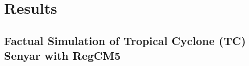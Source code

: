 \documentclass[
11pt,notheorems,hyperref={pdfauthor=whatever}
]{beamer}
\begin{document}
    



\section{Results}

\subsection{Factual Simulation of Tropical Cyclone (TC) Senyar with RegCM5}
\end{document}
